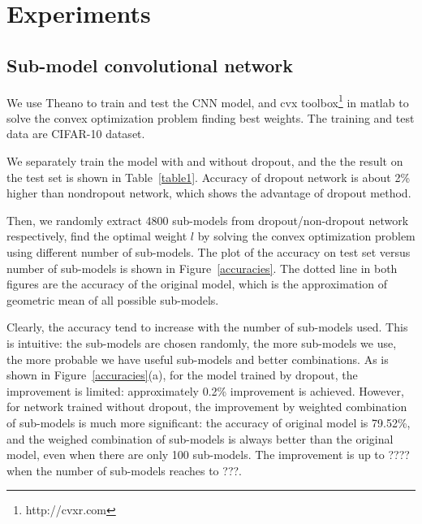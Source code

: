 \documentclass{article} %
\begin{document}
\section{Experiments}
\subsection{Sub-model convolutional network}
We use Theano\cite{theano} to train and test the CNN model, and cvx toolbox\footnote{http://cvxr.com} in matlab to solve the convex optimization problem finding best weights. The training and test data are CIFAR-10 dataset.
\par
We separately train the model with and without dropout, and the the result on the test set is shown in Table~\ref{table1}. Accuracy of dropout network is about 2\% higher than nondropout network, which shows the advantage of dropout method.
\par
Then, we randomly extract 4800 sub-models from dropout/non-dropout network respectively, find the optimal weight $l$ by solving the convex optimization problem using different number of sub-models. The plot of the accuracy on test set versus number of sub-models is shown in Figure~\ref{accuracies}. The dotted line in both figures are the accuracy of the original model, which is the approximation of geometric mean of all possible sub-models.
\par 
Clearly, the accuracy tend to increase with the number of sub-models used. This is intuitive: the sub-models are chosen randomly, the more sub-models we use, the more probable we have useful sub-models and better combinations. As is shown in Figure~\ref{accuracies}(a), for the model trained by dropout, the improvement is limited: approximately 0.2\% improvement is achieved. However, for network trained without dropout, the improvement by weighted combination of sub-models is much more significant: the accuracy of original model is 79.52\%, and the weighed combination of sub-models is always better than the original model, even when there are only 100 sub-models. The improvement is up to ???? when the number of sub-models reaches to ???.
\par
\end{document}
